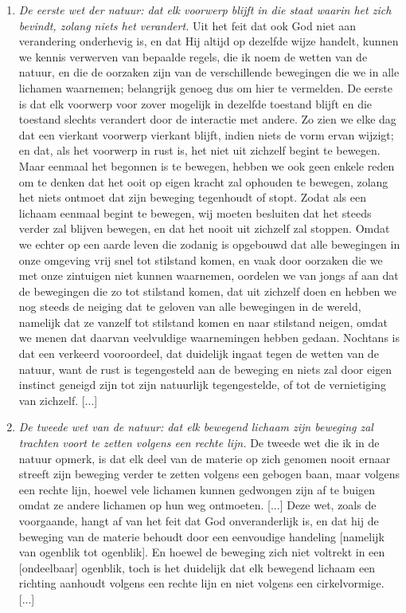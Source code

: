 \documentclass{ximera}
\begin{document}
	{\footnotesize
	
	\begin{enumerate}
	\item[]\textit{De eerste wet der natuur: dat elk voorwerp blijft in die staat waarin het zich bevindt, zolang niets het verandert.}
	Uit het feit dat ook God niet aan verandering onderhevig is, en dat Hij altijd op dezelfde wijze handelt, kunnen we kennis verwerven van bepaalde regels, die ik noem de wetten van de natuur, en die de oorzaken zijn van de verschillende bewegingen die we in alle lichamen waarnemen; belangrijk genoeg dus om hier te vermelden. De eerste is dat elk voorwerp voor zover mogelijk in dezelfde toestand blijft en die toestand slechts verandert door de interactie met andere. Zo zien we elke dag dat een vierkant voorwerp vierkant blijft, indien niets de vorm ervan wijzigt; en dat, als het voorwerp in rust is, het niet uit zichzelf begint te bewegen. Maar eenmaal het begonnen is te bewegen, hebben we ook geen enkele reden om te denken dat het ooit op eigen kracht zal ophouden te bewegen, zolang het niets ontmoet dat zijn beweging tegenhoudt of stopt. Zodat als een lichaam eenmaal begint te bewegen, wij moeten besluiten dat het steeds verder zal blijven bewegen, en dat het nooit uit zichzelf zal stoppen. Omdat we echter op een aarde leven die zodanig is opgebouwd dat alle bewegingen in onze omgeving vrij snel tot stilstand komen, en vaak door oorzaken die we met onze zintuigen niet kunnen waarnemen, oordelen we van jongs af aan dat de bewegingen die zo tot stilstand komen, dat uit zichzelf doen en hebben we nog steeds de neiging dat te geloven van alle bewegingen in de wereld, namelijk dat ze vanzelf tot stilstand komen en naar stilstand neigen, omdat we menen dat daarvan veelvuldige waarnemingen hebben gedaan. Nochtans is dat een verkeerd vooroordeel, dat duidelijk ingaat tegen de wetten van de natuur, want de rust is tegengesteld aan de beweging en niets zal door eigen instinct geneigd zijn tot zijn natuurlijk tegengestelde, of tot de vernietiging van zichzelf. [...]
	
	\item[]\textit{De tweede wet van de natuur: dat elk bewegend lichaam zijn beweging zal trachten voort te
	zetten volgens een rechte lijn.} De tweede wet die ik in de natuur opmerk, is dat elk deel van de materie op zich genomen nooit ernaar streeft zijn beweging verder te zetten volgens een gebogen baan, maar volgens een rechte lijn, hoewel vele lichamen kunnen gedwongen zijn af te buigen omdat ze andere lichamen op hun weg ontmoeten. [...] Deze wet, zoals de voorgaande, hangt af van het feit dat God onveranderlijk is, en dat hij de beweging van de materie behoudt door een eenvoudige handeling [namelijk van ogenblik tot ogenblik]. En hoewel de beweging zich niet voltrekt in een [ondeelbaar] ogenblik, toch is het duidelijk dat elk bewegend lichaam een richting aanhoudt volgens een rechte lijn en niet volgens een cirkelvormige. [...]
	

\end{enumerate}}
\end{document}
